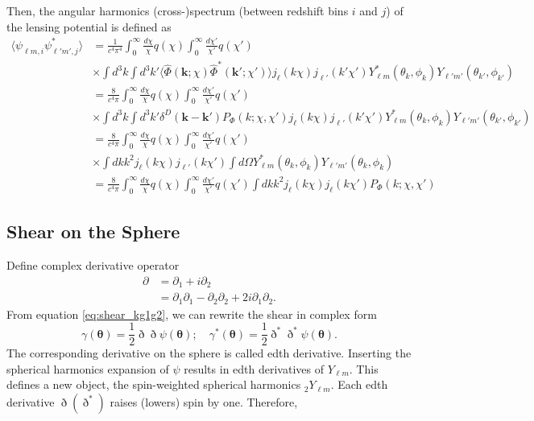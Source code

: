 Then, the angular harmonics (cross-)spectrum (between redshift bins $i$ and $j$) of the lensing potential is defined as
\begin{align}
    \nonumber \langle\psi_{\ell m, i}\psi^*_{\ell' m', j}\rangle &= \frac{1}{c^4 \pi^4} \int_0^\infty \frac{d\chi}{\chi}q(\chi) \int_0^\infty \frac{d\chi'}{\chi'}q(\chi') \\
    &\nonumber \times \int d^3k \int d^3k'\langle\hat{\Phi}(\bm{k};\chi)\hat{\Phi}^*(\bm{k'};\chi'
    )\rangle j_{\ell}(k\chi)j_{\ell'}(k'\chi') Y^*_{\ell m}(\theta_k, \phi_k)Y_{\ell' m'}(\theta_{k'}, \phi_{k'})\\
    \nonumber &= \frac{8}{c^4 \pi} \int_0^\infty \frac{d\chi}{\chi}q(\chi) \int_0^\infty \frac{d\chi'}{\chi'}q(\chi') \\
    &\nonumber \times \int d^3k \int d^3k' \delta^D(\bm{k}-\bm{k'}) P_\Phi(k;\chi,\chi')j_{\ell}(k\chi)j_{\ell'}(k'\chi') Y^*_{\ell m}(\theta_k, \phi_k)Y_{\ell' m'}(\theta_{k'}, \phi_{k'})\\
    \nonumber &= \frac{8}{c^4 \pi} \int_0^\infty \frac{d\chi}{\chi}q(\chi) \int_0^\infty \frac{d\chi'}{\chi'}q(\chi') \\
    &\nonumber \times \int dk k^2 j_{\ell}(k\chi)j_{\ell'}(k\chi') \int d\Omega Y^*_{\ell m}(\theta_k, \phi_k)Y_{\ell' m'}(\theta_{k}, \phi_{k}) \\
    &= \frac{8}{c^4 \pi} \int_0^\infty \frac{d\chi}{\chi}q(\chi) \int_0^\infty \frac{d\chi'}{\chi'}q(\chi') \int dk k^2 j_\ell(k\chi)j_\ell(k\chi') P_\Phi(k;\chi,\chi')
\end{align}

\subsection{Shear on the Sphere}
Define complex derivative operator
\begin{align}
    \nonumber \partial &= \partial_1 + i\partial_2\\
    &= \partial_1\partial_1 - \partial_2\partial_2 + 2i\partial_1\partial_2.
\end{align}
From equation \ref{eq:shear_kg1g2}, we can rewrite the shear in complex form
\begin{equation}
    \label{eq:shear_edth}
    \gamma(\bm{\theta}) = \frac{1}{2}\eth \eth \psi(\bm{\theta}); \quad \gamma^*(\bm{\theta})=\frac{1}{2}\eth^*\eth^*\psi(\bm{\theta}).
\end{equation}
The corresponding derivative on the sphere is called edth derivative. Inserting the spherical harmonics expansion of $\psi$ results in edth derivatives of $Y_{\ell m}$. This defines a new object, the spin-weighted spherical harmonics ${}_2 Y_{\ell m}$. Each edth derivative $\eth (\eth^*)$ raises (lowers) spin by one. Therefore,

